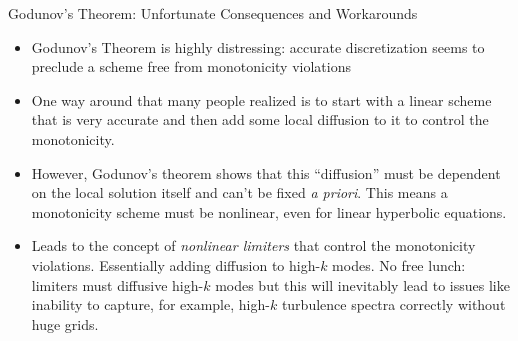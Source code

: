 \documentclass[aspectratio=169]{beamer}
\newcommand{\mypause}{}
\begin{document}
\begin{frame}{Godunov's Theorem: Unfortunate Consequences and Workarounds}
  \begin{itemize}
  \item Godunov's Theorem is highly distressing: accurate
    discretization seems to preclude a scheme free from monotonicity
    violations
    \mypause%
  \item One way around that many people realized is to start with a
    linear scheme that is very accurate and then add some local
    diffusion to it to control the monotonicity.
    \mypause%
  \item However, Godunov's theorem shows that this ``diffusion'' must
    be dependent on the local solution itself and can't be fixed
    \emph{a priori}. This means a monotonicity scheme must be
    nonlinear, even for linear hyperbolic equations.
    \mypause%
  \item Leads to the concept of \emph{nonlinear limiters} that control
    the monotonicity violations. Essentially adding diffusion to
    high-$k$ modes. No free lunch: limiters must diffusive high-$k$
    modes but this will inevitably lead to issues like inability to
    capture, for example, high-$k$ turbulence spectra correctly
    without huge grids.
  \end{itemize}
\end{frame}
  
\end{document}
